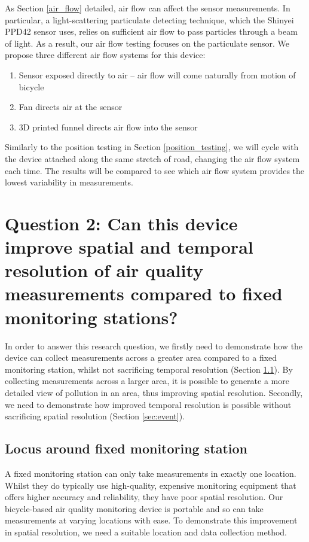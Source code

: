 \documentclass[11pt]{report}
\begin{document}
As Section \ref{air_flow} detailed, air flow can affect the sensor measurements. In particular, a light-scattering particulate detecting technique, which the Shinyei PPD42 sensor uses, relies on sufficient air flow to pass particles through a beam of light. As a result, our air flow testing focuses on the particulate sensor. We propose three different air flow systems for this device:

\begin{enumerate}
\item Sensor exposed directly to air -- air flow will come naturally from motion of bicycle
\item Fan directs air at the sensor
\item 3D printed funnel directs air flow into the sensor
\end{enumerate}

Similarly to the position testing in Section \ref{position_testing}, we will cycle with the device attached along the same stretch of road, changing the air flow system each time. The results will be compared to see which air flow system provides the lowest variability in measurements.

\section{Question 2: Can this device improve spatial and temporal resolution of air quality measurements compared to fixed monitoring stations?}  \label{meth:q2}

In order to answer this research question, we firstly need to demonstrate how the device can collect measurements across a greater area compared to a fixed monitoring station, whilst not sacrificing temporal resolution (Section \ref{sec:locus}). By collecting measurements across a larger area, it is possible to generate a more detailed view of pollution in an area, thus improving spatial resolution. Secondly, we need to demonstrate how improved temporal resolution is possible without sacrificing spatial resolution (Section \ref{sec:event}). 

\subsection{Locus around fixed monitoring station} \label{sec:locus}

A fixed monitoring station can only take measurements in exactly one location. Whilst they do typically use high-quality, expensive monitoring equipment that offers higher accuracy and reliability, they have poor spatial resolution. Our bicycle-based air quality monitoring device is portable and so can take measurements at varying locations with ease. To demonstrate this improvement in spatial resolution, we need a suitable location and data collection method. 
\end{document}
